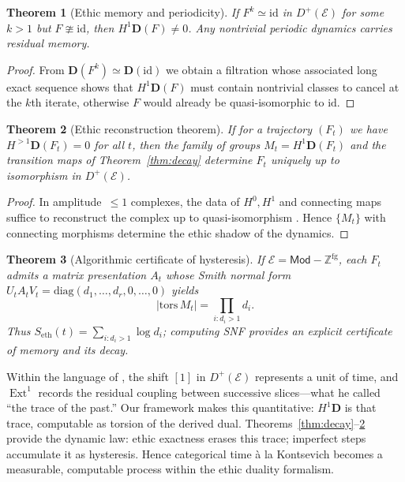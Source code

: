 \documentclass[12pt]{article}
\newcommand{\E}{\mathcal{E}}
\newcommand{\Mod}{\mathsf{Mod}}
\newcommand{\ZZ}{\mathbb{Z}}
\newcommand{\Ext}{\operatorname{Ext}}
\newcommand{\Dplus}{D^{+}}
\theoremstyle{plain}
\newtheorem{theorem}{Theorem}[section]
\theoremstyle{definition}
\theoremstyle{remark}
\numberwithin{equation}{section}
\begin{document}
\begin{theorem}[Ethic memory and periodicity]\label{thm:periodic}
If $F^k\simeq \mathrm{id}$ in $\Dplus(\E)$ for some $k>1$ but $F\ncong \mathrm{id}$, then $H^1\mathbf D(F)\ne 0$. Any nontrivial periodic dynamics carries residual memory.
\end{theorem}

\begin{proof}
From $\mathbf D(F^k)\simeq\mathbf D(\mathrm{id})$ we obtain a filtration whose associated long exact sequence shows that $H^1\mathbf D(F)$ must contain nontrivial classes to cancel at the $k$th iterate, otherwise $F$ would already be quasi-isomorphic to $\mathrm{id}$.
\end{proof}

\begin{theorem}[Ethic reconstruction theorem]\label{thm:reconstruction}
If for a trajectory $(F_t)$ we have $H^{>1}\mathbf D(F_t)=0$ for all $t$, then the family of groups $M_t=H^1\mathbf D(F_t)$ and the transition maps of Theorem~\ref{thm:decay} determine $F_t$ uniquely up to isomorphism in $\Dplus(\E)$.
\end{theorem}

\begin{proof}
In amplitude~$\le1$ complexes, the data of $H^0,H^1$ and connecting maps suffice to reconstruct the complex up to quasi-isomorphism \cite{Weibel1994}. Hence $\{M_t\}$ with connecting morphisms determine the ethic shadow of the dynamics.
\end{proof}

\begin{theorem}[Algorithmic certificate of hysteresis]
If $\E=\Mod\!-\!\ZZ^{\mathrm{fg}}$, each $F_t$ admits a matrix presentation $A_t$ whose Smith normal form $U_tA_tV_t=\mathrm{diag}(d_1,\dots,d_r,0,\dots,0)$ yields
\[
|\mathrm{tors}\,M_t|=\prod_{i:d_i>1}d_i.
\]
Thus $S_{\mathrm{eth}}(t)=\sum_{i:d_i>1}\log d_i$; computing SNF provides an explicit certificate of memory and its decay.
\end{theorem}

Within the language of \cite{Kontsevich2008}, the shift $[1]$ in $D^+(\E)$ represents a unit of time, and $\Ext^1$ records the residual coupling between successive slices—what he called “the trace of the past.” 
Our framework makes this quantitative: $H^1\mathbf D$ is that trace, computable as torsion of the derived dual. 
Theorems~\ref{thm:decay}--\ref{thm:reconstruction} provide the dynamic law: ethic exactness erases this trace; imperfect steps accumulate it as hysteresis. 
Hence categorical time à la Kontsevich becomes a measurable, computable process within the ethic duality formalism.
\end{document}
